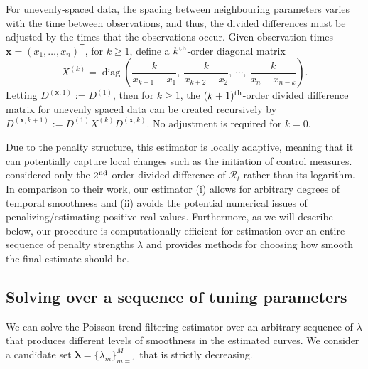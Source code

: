 \documentclass[10pt,letterpaper]{article}
\newcommand{\lr}[1]{\left(#1\right)}
\DeclareMathOperator*{\diag}{diag}
\def\bfx{\mathbf{x}}
\def\calR{\mathcal{R}}
\renewcommand{\top}{\mathsf{T}}
\def\th{^{\textnormal{th}}}
\def\second{$2^{\textnormal{nd}}$}
\begin{document}
For unevenly-spaced data, the spacing between neighbouring parameters
varies with the time between observations, and thus, the divided differences
must be adjusted by the times that the observations occur. Given observation
times $\bfx = {(x_1,\dots,x_n)}^\top$, for $k \geq 1$, define a $k\th$-order
diagonal matrix 
\begin{equation}
  X^{(k)} = \diag \lr{\frac{k}{x_{k+1} - x_1},\ \frac{k}{x_{k+2} - x_2},\ 
  \cdots,\ \frac{k}{x_n - x_{n-k}} }.
\end{equation}
Letting $D^{(\bfx,1)} := D^{(1)}$,
then for $k\geq 1$, the $(k+1)\th$-order divided difference matrix for unevenly
spaced data can be created recursively by
$D^{(\bfx, k+1)} := D^{(1)} X^{(k)} D^{(\bfx,k)}.$ No adjustment is required
for $k=0$. 


Due to the penalty structure, this estimator is locally adaptive,
meaning that it can potentially capture local changes such as the initiation of
control measures. \cite{abry2020spatial,pascal2022nonsmooth} considered only the
\second-order divided difference of $\calR_t$ rather than its logarithm. In
comparison to their work, our estimator (i) allows for arbitrary degrees of
temporal smoothness and (ii) avoids the potential numerical issues of
penalizing/estimating positive real values. Furthermore, as we will describe
below, our procedure is computationally efficient for estimation over an entire
sequence of penalty strengths $\lambda$ and provides methods for choosing how
smooth the final estimate should be.


\subsection{Solving over a sequence of tuning parameters}
\label{sec:candidate-set}

We can solve the Poisson trend filtering estimator over an arbitrary sequence of 
$\lambda$ that produces different levels of smoothness in the estimated curves. 
We consider a candidate set $\boldsymbol{\lambda} = \{\lambda_m\}_{m=1}^M$
that is strictly decreasing.
\end{document}
